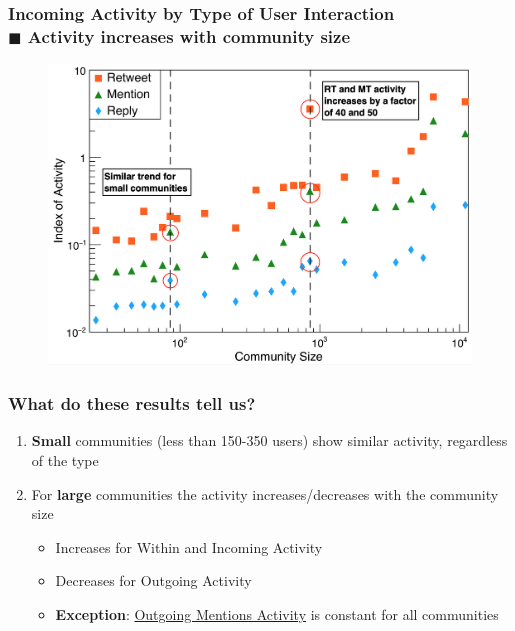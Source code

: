 \documentclass{beamer}
\begin{document}

\begin{frame}
\frametitle{Incoming Activity by Type of User Interaction \\ \normalsize $\blacksquare$ Activity increases with community size}
\begin{figure}
	\vspace*{-0.1cm}
	\includegraphics[width=0.8\linewidth]{figures/activity/incoming}
\end{figure}
\end{frame}


\begin{frame}
\frametitle{What do these results tell us?}
	\begin{enumerate}
		\item \large \textbf{Small} communities (less than 150-350 users) show similar activity, regardless of the type
		\vspace{0.5cm}
		\item \large For \textbf{large} communities the activity increases/decreases with the community size 
		\begin{itemize}
			\item Increases for Within and Incoming Activity
			\item Decreases for Outgoing Activity
			\vspace{0.5cm}
			\item \textbf{Exception}: \underline{Outgoing Mentions Activity} is constant for all communities
		\end{itemize}
	\end{enumerate}
\end{frame}

\end{document}
